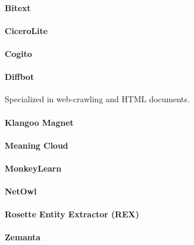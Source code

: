 \paragraph{Bitext}

\paragraph{CiceroLite}

\paragraph{Cogito}

\paragraph{Diffbot} Specialized in web-crawling and HTML documents.

\paragraph{Klangoo Magnet}

\paragraph{Meaning Cloud}

\paragraph{MonkeyLearn}

\paragraph{NetOwl}

\paragraph{Rosette Entity Extractor (REX)}

\paragraph{Zemanta}
